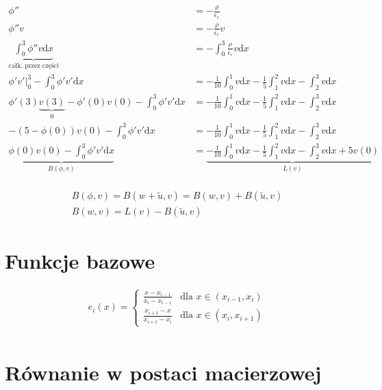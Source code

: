 \documentclass[12pt,a4paper]{mwart}
\begin{document}
\begin{align*}
    \phi'' &= -\frac{\rho}{\epsilon_r} \\
    \phi''v &= -\frac{\rho}{\epsilon_r}v \\
    \underbrace{\int_0^3\phi''v\mathrm{d}x}_\text{całk. przez części} &= -\int_0^3\frac{\rho}{\epsilon_r}v\mathrm{d}x \\
    \phi'v'\big|_0^3 - \int_0^3\phi'v'\mathrm{d}x &= -\frac{1}{10}\int_0^1v\mathrm{d}x -\frac{1}{5}\int_1^2v\mathrm{d}x -\int_2^3v\mathrm{d}x \\
    \phi'(3)\underbrace{v(3)}_{0} - \phi'(0)v(0) - \int_0^3\phi'v'\mathrm{d}x &= -\frac{1}{10}\int_0^1v\mathrm{d}x -\frac{1}{5}\int_1^2v\mathrm{d}x -\int_2^3v\mathrm{d}x \\
    - (5-\phi(0))v(0) - \int_0^3\phi'v'\mathrm{d}x &= -\frac{1}{10}\int_0^1v\mathrm{d}x -\frac{1}{5}\int_1^2v\mathrm{d}x -\int_2^3v\mathrm{d}x \\
    \underbrace{\phi(0)v(0) - \int_0^3\phi'v'\mathrm{d}x}_\text{$B(\phi, v)$} &= \underbrace{-\frac{1}{10}\int_0^1v\mathrm{d}x -\frac{1}{5}\int_1^2v\mathrm{d}x -\int_2^3v\mathrm{d}x + 5v(0)}_\text{$L(v)$} \\ 
\end{align*}

\begin{equation*}
    \begin{gathered}
        B(\phi, v) = B(w + \widetilde{u}, v) = B(w, v) + B(\widetilde{u}, v) \\
        B(w,v) = L(v) - B(\widetilde{u}, v)
    \end{gathered}
\end{equation*}

\section{Funkcje bazowe}
\begin{equation*}
    \begin{gathered}
    e_i(x) =
    \begin{cases}
        \frac{x - x_{i-1}}{x_i - x_{i-1}} & \text{dla $x\in(x_{i-1},x_i)$} \\
        \frac{x_{i+1} - x}{x_{i+1} - x_i} & \text{dla $x\in(x_i,x_{i+1})$}
    \end{cases} \\
    \end{gathered}
\end{equation*}

\section{Równanie w postaci macierzowej}
\end{document}
